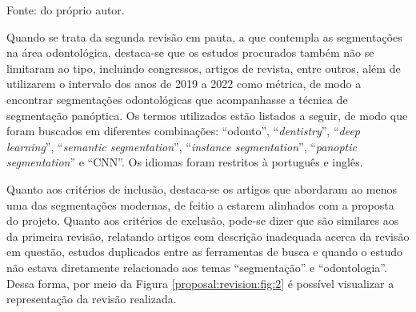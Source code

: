 \begin{table}[H]
    \centering
    \caption{Trabalhos selecionados a partir da revisão sobre segmentação panóptica.}
    \label{proposal:revision:1}

    \vspace*{1 cm}
    Fonte: do próprio autor.
\end{table}

Quando se trata da segunda revisão em pauta, a que contempla as segmentações na área odontológica, destaca-se que os estudos procurados também não se limitaram ao tipo, incluindo congressos, artigos de revista, entre outros, além de utilizarem o intervalo dos anos de 2019 a 2022 como métrica, de modo a encontrar segmentações odontológicas que acompanhasse a técnica de segmentação panóptica. Os termos utilizados estão listados a seguir, de modo que foram buscados em diferentes combinações: ``odonto'', ``\textit{dentistry}'', ``\textit{deep learning}'', ``\textit{semantic segmentation}'', ``\textit{instance segmentation}'', ``\textit{panoptic segmentation}'' e ``CNN''. Os idiomas foram restritos à português e inglês.

Quanto aos critérios de inclusão, destaca-se os artigos que abordaram ao menos uma das segmentações modernas, de feitio a estarem alinhados com a proposta do projeto. Quanto aos critérios de exclusão, pode-se dizer que são similares aos da primeira revisão, relatando artigos com descrição inadequada acerca da revisão em questão, estudos duplicados entre as ferramentas de busca e quando o estudo não estava diretamente relacionado aos temas ``segmentação'' e ``odontologia''. Dessa forma, por meio da Figura \ref{proposal:revision:fig:2} é possível visualizar a representação da revisão realizada.

